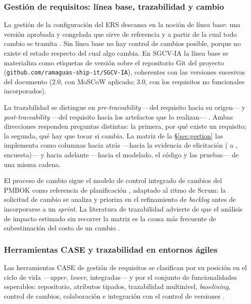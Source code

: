 \subsubsection*{Gestión de requisitos: línea base, trazabilidad y cambio}
 
La gestión de la configuración del ERS descansa en la noción de línea base: una versión aprobada y
congelada que sirve de referencia y a partir de la cual todo cambio se tramita \cite{swebok4}. Sin
línea base no hay control de cambios posible, porque no existe el estado respecto del cual algo
cambia. En SGCV-IA la línea base se materializa como etiquetas de versión sobre el repositorio
Git del proyecto (\texttt{github.com/ramaguas-ship-it/SGCV-IA}), coherentes con las versiones
sucesivas del documento (2.0, con MoSCoW aplicado; 3.0, con los requisitos no funcionales
incorporados).
 
La trazabilidad se distingue en \emph{pre-traceability} ---del requisito hacia su origen--- y
\emph{post-traceability} ---del requisito hacia los artefactos que lo realizan--- \cite{gotel1994}.
Ambas direcciones responden preguntas distintas: la primera, por qué existe un requisito; la segunda,
qué hay que tocar si cambia. La matriz de la \S\ref{sec:gestion} las implementa como columnas hacia
atrás ---hacia la evidencia de elicitación ( a , encuesta)--- y hacia
adelante ---hacia el modelado, el código y las pruebas--- de una misma cadena.
 
El proceso de cambio sigue el modelo de control integrado de cambios del PMBOK como referencia de
planificación \cite{pmbok7}, adaptado al ritmo de Scrum: la solicitud de cambio se analiza y prioriza
en el refinamiento de \emph{backlog} antes de incorporarse a un \emph{sprint}. La literatura de
trazabilidad advierte de que el análisis de impacto estimado sin recorrer la matriz es la causa más
frecuente de subestimación del costo de un cambio \cite{clelandhuang2012}.
 
\subsubsection*{Herramientas CASE y trazabilidad en entornos ágiles}
 
Las herramientas CASE de gestión de requisitos se clasifican por su posición en el ciclo de vida
---\emph{upper}, \emph{lower}, integradas--- y por el conjunto de funcionalidades esperables:
repositorio, atributos tipados, trazabilidad multinivel, \emph{baselining}, control de cambios,
colaboración e integración con el control de versiones \cite{wiegers2013}.
 
